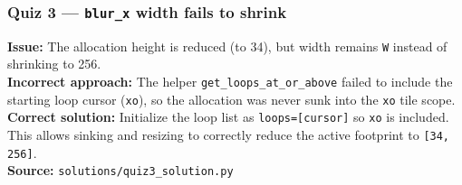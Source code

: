 \subsubsection{Quiz 3 --- \texttt{blur\_x} width fails to shrink}

\textbf{Issue:} The allocation height is reduced (to 34), but width remains \texttt{W} instead of shrinking to 256.\\
\textbf{Incorrect approach:} The helper \texttt{get\_loops\_at\_or\_above} failed to include the starting loop cursor (\texttt{xo}), so the allocation was never sunk into the \texttt{xo} tile scope.\\
\textbf{Correct solution:} Initialize the loop list as \texttt{loops=[cursor]} so \texttt{xo} is included. This allows sinking and resizing to correctly reduce the active footprint to \texttt{[34, 256]}.\\
\textbf{Source:} \texttt{solutions/quiz3\_solution.py}

